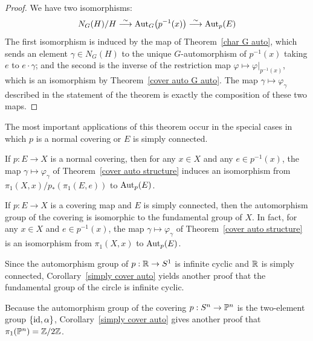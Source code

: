\begin{proof}
We have two isomorphisms:
\[N_G(H)/H\stackrel{\sim}{\longrightarrow}\Aut_G\big(p^{-1}(x)\big)\stackrel{\sim}{\longrightarrow}\Aut_p(E)\]
The first isomorphism is induced by the map of Theorem~\ref{char G auto}, which sends an element $\gamma\in N_G(H)$ to the unique $G$-automorphism of $p^{-1}(x)$ taking $e$ to $e\cdot\gamma$; and the second is the inverse of the restriction map $\varphi\mapsto\varphi|_{p^{-1}(x)}$, which is an isomorphism by Theorem~\ref{cover auto G auto}. The map $\gamma\mapsto\varphi_\gamma$ described in the statement of the theorem is exactly the composition of these two maps.
\end{proof}
The most important applications of this theorem occur in the special cases in which $p$ is a normal covering or $E$ is simply connected.
\begin{corollary}\label{normal cover auto}
If $p:E\to X$ is a normal covering, then for any $x\in X$ and any $e\in p^{-1}(x)$, the map $\gamma\mapsto\varphi_\gamma$ of Theorem~\ref{cover auto structure} induces an isomorphism from $\pi_1(X,x)/p_*(\pi_1(E,e))$ to $\Aut_p(E)$.
\end{corollary}
\begin{corollary}\label{simply cover auto}
If $p:E\to X$ is a covering map and $E$ is simply connected, then the automorphism group of the covering is isomorphic to the fundamental group of $X$. In fact, for any $x\in X$ and $e\in p^{-1}(x)$, the map $\gamma\mapsto\varphi_\gamma$ of Theorem~\ref{cover auto structure} is an isomorphism from $\pi_1(X,x)$ to $\Aut_p(E)$.
\end{corollary}
\begin{example}
Since the automorphism group of $p:\R\to S^1$ is infinite cyclic and $\R$ is simply connected, Corollary~\ref{simply cover auto} yields another proof that the fundamental group of the circle is infinite cyclic.
\end{example}
\begin{example}
Because the automorphism group of the covering $p:S^n\to\P^n$ is
the two-element group $\{\id,\alpha\}$, Corollary~\ref{simply cover auto} gives another proof that $\pi_1(\P^n)=\Z/2\Z$.
\end{example}
